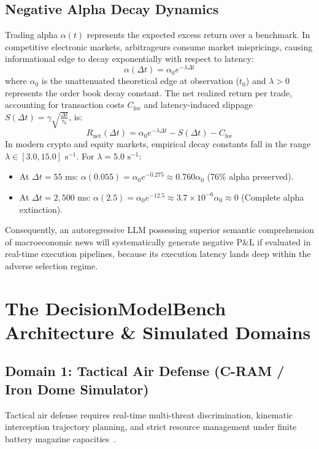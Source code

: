 \documentclass[journal,compsoc]{IEEEtran}
\begin{document}
\subsection{Negative Alpha Decay Dynamics}
Trading alpha $\alpha(t)$ represents the expected excess return over a benchmark. In competitive electronic markets, arbitrageurs consume market mispricings, causing informational edge to decay exponentially with respect to latency:
\begin{equation}
\alpha(\Delta t) = \alpha_0 e^{-\lambda \Delta t}
\end{equation}
where $\alpha_0$ is the unattenuated theoretical edge at observation ($t_0$) and $\lambda > 0$ represents the order book decay constant. The net realized return per trade, accounting for transaction costs $C_{\text{fee}}$ and latency-induced slippage $S(\Delta t) = \gamma \sqrt{\frac{\Delta t}{\tau_0}}$, is:
\begin{equation}
R_{\text{net}}(\Delta t) = \alpha_0 e^{-\lambda \Delta t} - S(\Delta t) - C_{\text{fee}}
\end{equation}
In modern crypto and equity markets, empirical decay constants fall in the range $\lambda \in [3.0, 15.0] \text{ s}^{-1}$. For $\lambda = 5.0 \text{ s}^{-1}$:
\begin{itemize}
    \item At $\Delta t = 55 \text{ ms}$: $\alpha(0.055) = \alpha_0 e^{-0.275} \approx 0.760 \alpha_0$ (76\% alpha preserved).
    \item At $\Delta t = 2,500 \text{ ms}$: $\alpha(2.5) = \alpha_0 e^{-12.5} \approx 3.7 \times 10^{-6} \alpha_0 \approx 0$ (Complete alpha extinction).
\end{itemize}
Consequently, an autoregressive LLM possessing superior semantic comprehension of macroeconomic news will systematically generate negative P\&L if evaluated in real-time execution pipelines, because its execution latency lands deep within the adverse selection regime.

\section{The DecisionModelBench Architecture \& Simulated Domains}

\subsection{Domain 1: Tactical Air Defense (C-RAM / Iron Dome Simulator)}
Tactical air defense requires real-time multi-threat discrimination, kinematic interception trajectory planning, and strict resource management under finite battery magazine capacities~\cite{zandbergen2022accuracy}.
\end{document}
